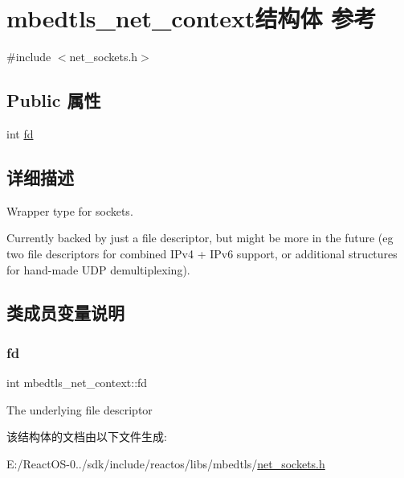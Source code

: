 \hypertarget{structmbedtls__net__context}{}\section{mbedtls\+\_\+net\+\_\+context结构体 参考}
\label{structmbedtls__net__context}


{\ttfamily \#include $<$net\+\_\+sockets.\+h$>$}

\subsection*{Public 属性}
\begin{DoxyCompactItemize}
\item 
int \hyperlink{structmbedtls__net__context_ad6eda44e3bfee722150d12a591408995}{fd}
\end{DoxyCompactItemize}


\subsection{详细描述}
Wrapper type for sockets.

Currently backed by just a file descriptor, but might be more in the future (eg two file descriptors for combined I\+Pv4 + I\+Pv6 support, or additional structures for hand-\/made U\+DP demultiplexing). 

\subsection{类成员变量说明}
\mbox{\label{structmbedtls__net__context_ad6eda44e3bfee722150d12a591408995}} 
\subsubsection{\texorpdfstring{fd}{fd}}
{\footnotesize\ttfamily int mbedtls\+\_\+net\+\_\+context\+::fd}

The underlying file descriptor 

该结构体的文档由以下文件生成\+:\begin{DoxyCompactItemize}
\item 
E\+:/\+React\+O\+S-\/0../sdk/include/reactos/libs/mbedtls/\hyperlink{net__sockets_8h}{net\+\_\+sockets.\+h}\end{DoxyCompactItemize}
